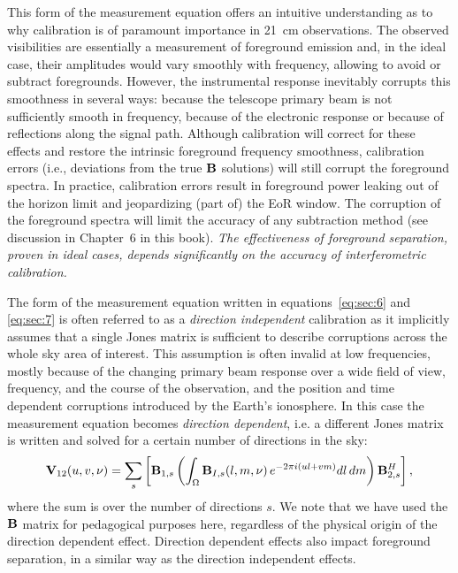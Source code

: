 This form of the measurement equation offers an intuitive understanding as to why calibration is of paramount importance in 21~cm observations. The observed visibilities are essentially a measurement of foreground emission and, in the ideal case, their amplitudes would vary smoothly with frequency, allowing to avoid or subtract foregrounds. However, the instrumental response inevitably corrupts this smoothness in several ways: because the telescope primary beam is not sufficiently smooth in frequency, because of the electronic response or because of reflections along the signal path. Although calibration will correct for these effects and restore the intrinsic foreground frequency smoothness, calibration errors (i.e., deviations from the true ${\bf B}$ solutions) will still corrupt the foreground spectra. In practice, calibration errors result in foreground power leaking out of the horizon limit and jeopardizing (part of) the EoR window. The corruption of the foreground spectra will limit the accuracy of any subtraction method (see discussion in Chapter~6 in this book). {\it The effectiveness of foreground separation, proven in ideal cases, depends significantly on the accuracy of interferometric calibration.}

The form of the measurement equation written in equations~\ref{eq:sec:6} and \ref{eq:sec:7} is often referred to as a {\it direction independent} calibration as it implicitly assumes that a single Jones matrix is sufficient to describe corruptions across the whole sky area of interest. This assumption is often invalid at low frequencies, mostly because of the changing primary beam response over a wide field of view, frequency, and the course of the observation, and the position and time dependent corruptions introduced by the Earth's ionosphere. In this case the measurement equation becomes {\it direction dependent}, i.e. a different Jones matrix is written and solved for a certain number of directions in the sky:
\begin{equation}
{\bf V}_{12} (u,v,\nu) = \sum_s \left[ {\bf B}_{1,s} \left( \int_\Omega {\bf B}_{I,s} (l, m, \nu) \, e^{-2 \pi i (ul + vm)} dl \, dm  \right) {\bf B}_{2,s}^H \right],
\label{eq:sec:7_added}
\end{equation}
where the sum is over the number of directions $s$. We note that we have used the ${\bf B}$ matrix for pedagogical purposes here, regardless of the physical origin of the direction dependent effect. Direction dependent effects also impact foreground separation, in a similar way as the direction independent effects.
 
